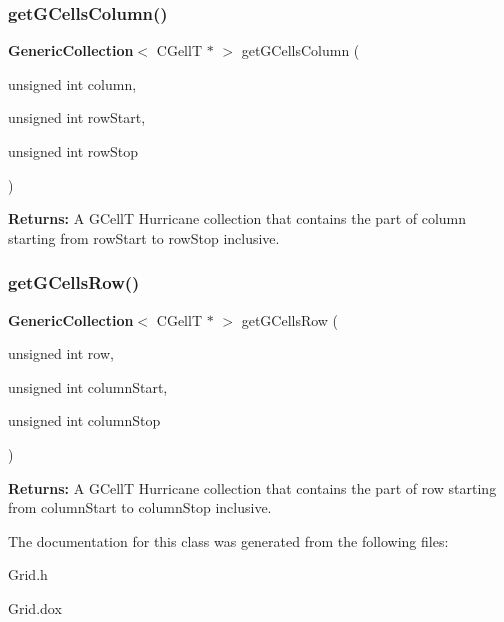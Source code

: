 \subsubsection{\texorpdfstring{get\+G\+Cells\+Column()}{getGCellsColumn()}}
{\footnotesize\ttfamily \textbf{ Generic\+Collection}$<$ C\+GellT $\ast$ $>$ get\+G\+Cells\+Column (\begin{DoxyParamCaption}\item[{unsigned int}]{column,  }\item[{unsigned int}]{row\+Start,  }\item[{unsigned int}]{row\+Stop }\end{DoxyParamCaption})\hspace{0.3cm}{\ttfamily [inline]}}

{\bfseries Returns\+:} A G\+CellT Hurricane collection that contains the part of {\ttfamily column} starting from {\ttfamily row\+Start} to {\ttfamily row\+Stop} inclusive. \mbox{\label{classKatabatic_1_1Grid_a35e2075302cdb696945f05c5bcc817a0}} 
\subsubsection{\texorpdfstring{get\+G\+Cells\+Row()}{getGCellsRow()}}
{\footnotesize\ttfamily \textbf{ Generic\+Collection}$<$ C\+GellT $\ast$ $>$ get\+G\+Cells\+Row (\begin{DoxyParamCaption}\item[{unsigned int}]{row,  }\item[{unsigned int}]{column\+Start,  }\item[{unsigned int}]{column\+Stop }\end{DoxyParamCaption})\hspace{0.3cm}{\ttfamily [inline]}}

{\bfseries Returns\+:} A G\+CellT Hurricane collection that contains the part of {\ttfamily row} starting from {\ttfamily column\+Start} to {\ttfamily column\+Stop} inclusive. 

The documentation for this class was generated from the following files\+:\begin{DoxyCompactItemize}
\item 
Grid.\+h\item 
Grid.\+dox\end{DoxyCompactItemize}
